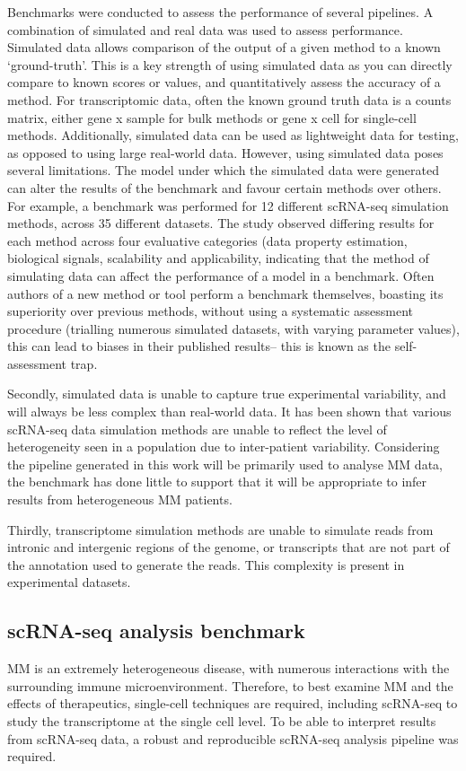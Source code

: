 Benchmarks were conducted to assess the performance of several pipelines.
A combination of simulated and real data was used to assess performance.
Simulated data allows comparison of the output of a given method to a known `ground-truth'.
This is a key strength of using simulated data as you can directly compare to known scores or values, and quantitatively assess the accuracy of a method.
For transcriptomic data, often the known ground truth data is a counts matrix, either gene x sample for bulk methods or gene x cell for single-cell methods.
Additionally, simulated data can be used as lightweight data for testing, as opposed to using large real-world data.
However, using simulated data poses several limitations.
The model under which the simulated data were generated can alter the results of the benchmark and favour certain methods over others.
For example, a benchmark was performed for 12 different scRNA-seq simulation methods, across 35 different datasets\cite{cao2021benchmark}.
The study observed differing results for each method across four evaluative categories (data property estimation, biological signals, scalability and applicability\cite{cao2021benchmark}, indicating that the method of simulating data can affect the performance of a model in a benchmark.
Often authors of a new method or tool perform a benchmark themselves, boasting its superiority over previous methods, without using a systematic assessment procedure (trialling numerous simulated datasets, with varying parameter values), this can lead to biases in their published results-- this is known as the self-assessment trap\cite{mangul2019systematic}.

Secondly, simulated data is unable to capture true experimental variability, and will always be less complex than real-world data\cite{mangul2019systematic}.
It has been shown that various scRNA-seq data simulation methods are unable to reflect the level of heterogeneity seen in a population due to inter-patient variability\cite{cao2021benchmark}.
Considering the pipeline generated in this work will be primarily used to analyse MM data, the benchmark has done little to support that it will be appropriate to infer results from heterogeneous MM patients.

Thirdly, transcriptome simulation methods are unable to simulate reads from intronic and intergenic regions of the genome, or transcripts that are not part of the annotation used to generate the reads.
This complexity is present in experimental datasets.


\subsection{scRNA-seq analysis benchmark}
MM is an extremely heterogeneous disease, with numerous interactions with the surrounding immune microenvironment.
Therefore, to best examine MM and the effects of therapeutics, single-cell techniques are required, including scRNA-seq to study the transcriptome at the single cell level.
To be able to interpret results from scRNA-seq data, a robust and reproducible scRNA-seq analysis pipeline was required.

